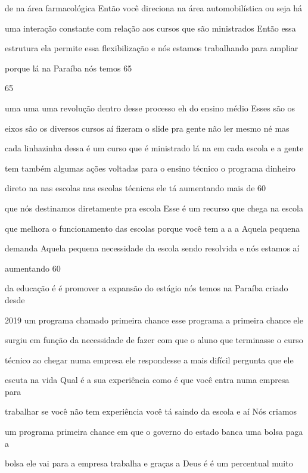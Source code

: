 \documentclass[a4paper,12pt]{article}
\begin{document}
de na área farmacológica Então você direciona na área automobilística ou seja há

uma interação constante com relação aos cursos que são ministrados Então essa

estrutura ela permite essa flexibilização e nós estamos trabalhando para ampliar

porque lá na Paraíba nós temos 65%

65%

uma uma uma revolução dentro desse processo eh do ensino médio Esses são os

eixos são os diversos cursos aí fizeram o slide pra gente não ler mesmo né mas

cada linhazinha dessa é um curso que é ministrado lá na em cada escola e a gente

tem também algumas ações voltadas para o ensino técnico o programa dinheiro

direto na nas escolas nas escolas técnicas ele tá aumentando mais de 60%

que nós destinamos diretamente pra escola Esse é um recurso que chega na escola

que melhora o funcionamento das escolas porque você tem a a a Aquela pequena

demanda Aquela pequena necessidade da escola sendo resolvida e nós estamos aí

aumentando 60%

da educação é é promover a expansão do estágio nós temos na Paraíba criado desde

2019 um programa chamado primeira chance esse programa a primeira chance ele

surgiu em função da necessidade de fazer com que o aluno que terminasse o curso

técnico ao chegar numa empresa ele respondesse a mais difícil pergunta que ele

escuta na vida Qual é a sua experiência como é que você entra numa empresa para

trabalhar se você não tem experiência você tá saindo da escola e aí Nós criamos

um programa primeira chance em que o governo do estado banca uma bolsa paga a

bolsa ele vai para a empresa trabalha e graças a Deus é é um percentual muito
\end{document}
